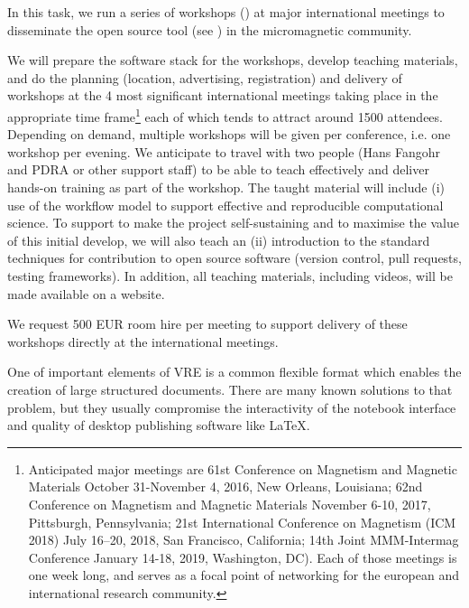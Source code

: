 \begin{workpackage}[id=dissem,wphases=18-48!.5,
  title=Dissemination,
  SARM=1,
  USORM=10,
  USHRM=8,
  USRM=24
]
\begin{tasklist}
\begin{task}[title=\OOMMFNB{} open source dissemination workshops,
id=dissemination-of-oommf-nb-workshops]
  In this task, we run a series of workshops () at major international
  meetings to disseminate the open source \OOMMFNB{} tool (see 
) in the
  micromagnetic community.

  We will prepare the software stack for the workshops, develop
  teaching materials, and do the planning (location, advertising,
  registration) and delivery of workshops at the 4 most significant
  international meetings taking place in the appropriate time
  frame\footnote{Anticipated major meetings are 61st Conference on
    Magnetism and Magnetic Materials October 31-November 4, 2016, New
    Orleans, Louisiana; 62nd Conference on Magnetism and Magnetic
    Materials November 6-10, 2017, Pittsburgh, Pennsylvania; 21st
    International Conference on Magnetism (ICM 2018) July 16–20, 2018,
    San Francisco, California; 14th Joint MMM-Intermag Conference
    January 14-18, 2019, Washington, DC). Each of those meetings is
    one week long, and serves as a focal point of networking for the
    european and international research community.} each of which
  tends to attract around 1500 attendees. Depending on demand,
  multiple workshops will be given per conference, i.e. one workshop
  per evening. We anticipate to travel with two people (Hans Fangohr
  and PDRA or other support staff) to be able to teach effectively and
  deliver hands-on training as part of the workshop. The taught
  material will include (i) use of the \OOMMFNB{} workflow model to
  support effective and reproducible computational science.  
  To support to make the \OOMMFNB{} project self-sustaining and to
  maximise the value of this initial develop, we will also teach an
  (ii) introduction to the standard techniques for contribution to
  open source software (version control, pull requests, testing
  frameworks).  In addition, all teaching materials, including videos,
  will be made available on a website.

  We request 500 EUR room hire per meeting to support delivery of
  these workshops directly at the international meetings.
\end{task}


\begin{task}[title=Demonstrator: interactive books,
id=ibook]

One of important elements of VRE is a common flexible format which
enables the creation of large structured documents. There are many
known solutions to that problem, but they usually compromise the
interactivity of the notebook interface and quality of desktop
publishing software like LaTeX. 


\end{task}
\end{tasklist}
\end{workpackage}
